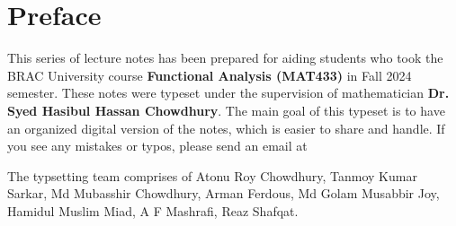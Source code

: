 \chapter{Preface}

This series of lecture notes has been prepared for aiding students who took the BRAC University course \textbf{Functional Analysis (MAT433)} in Fall 2024 semester. These notes were typeset under the supervision of mathematician \textbf{Dr. Syed Hasibul Hassan Chowdhury}. 
The main goal of this typeset is to have an organized digital version of the notes, which is easier to share and handle. If you see any mistakes or typos, please send an email at 

\vspace{10mm}

The typsetting team comprises of Atonu Roy Chowdhury, Tanmoy Kumar Sarkar, Md Mubasshir Chowdhury, Arman Ferdous, Md Golam Musabbir Joy, Hamidul Muslim Miad, A F Mashrafi, Reaz Shafqat.




%
